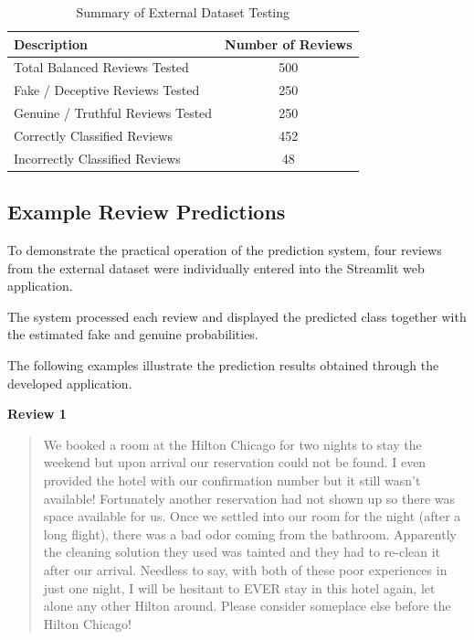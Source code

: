 \documentclass[12pt,a4paper]{report}
\begin{document}
\begin{table}[H]
\centering

\begin{tabular}{|l|c|}
\hline
\textbf{Description} & \textbf{Number of Reviews} \\ \hline
Total Balanced Reviews Tested & 500 \\ \hline
Fake / Deceptive Reviews Tested & 250 \\ \hline
Genuine / Truthful Reviews Tested & 250 \\ \hline
Correctly Classified Reviews & 452 \\ \hline
Incorrectly Classified Reviews & 48 \\ \hline
\end{tabular}
\caption{Summary of External Dataset Testing}
\label{tab:external_testing_summary}
\end{table}

\subsection{Example Review Predictions}

To demonstrate the practical operation of the
prediction system, four reviews from the external
dataset were individually entered into the
Streamlit web application.

The system processed each review and displayed
the predicted class together with the estimated
fake and genuine probabilities.

The following examples illustrate the prediction
results obtained through the developed application.

\vspace{0.3cm}
\noindent\textbf{Review 1}

\begin{quote}
We booked a room at the Hilton Chicago for two nights to stay the
weekend but upon arrival our reservation could not be found. I even
provided the hotel with our confirmation number but it still wasn't
available! Fortunately another reservation had not shown up so there
was space available for us. Once we settled into our room for the
night (after a long flight), there was a bad odor coming from the
bathroom. Apparently the cleaning solution they used was tainted and
they had to re-clean it after our arrival. Needless to say, with both
of these poor experiences in just one night, I will be hesitant to
EVER stay in this hotel again, let alone any other Hilton around.
Please consider someplace else before the Hilton Chicago!
\end{quote}
\end{document}
